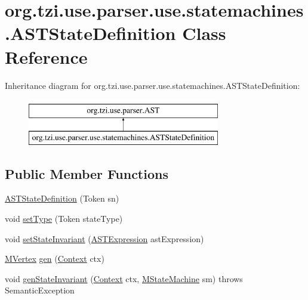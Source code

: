\hypertarget{classorg_1_1tzi_1_1use_1_1parser_1_1use_1_1statemachines_1_1_a_s_t_state_definition}{\section{org.\-tzi.\-use.\-parser.\-use.\-statemachines.\-A\-S\-T\-State\-Definition Class Reference}
\label{classorg_1_1tzi_1_1use_1_1parser_1_1use_1_1statemachines_1_1_a_s_t_state_definition}
}
Inheritance diagram for org.\-tzi.\-use.\-parser.\-use.\-statemachines.\-A\-S\-T\-State\-Definition\-:\begin{figure}[H]
\begin{center}
\leavevmode
\includegraphics[height=2.000000cm]{classorg_1_1tzi_1_1use_1_1parser_1_1use_1_1statemachines_1_1_a_s_t_state_definition}
\end{center}
\end{figure}
\subsection*{Public Member Functions}
\begin{DoxyCompactItemize}
\item 
\hyperlink{classorg_1_1tzi_1_1use_1_1parser_1_1use_1_1statemachines_1_1_a_s_t_state_definition_aaf8af62036dc111d9e37584ad4f00923}{A\-S\-T\-State\-Definition} (Token sn)
\item 
void \hyperlink{classorg_1_1tzi_1_1use_1_1parser_1_1use_1_1statemachines_1_1_a_s_t_state_definition_a6668c96d181fd1b3007ef8c8870eab76}{set\-Type} (Token state\-Type)
\item 
void \hyperlink{classorg_1_1tzi_1_1use_1_1parser_1_1use_1_1statemachines_1_1_a_s_t_state_definition_a8b31df8216863a40940c2300aacdbf2a}{set\-State\-Invariant} (\hyperlink{classorg_1_1tzi_1_1use_1_1parser_1_1ocl_1_1_a_s_t_expression}{A\-S\-T\-Expression} ast\-Expression)
\item 
\hyperlink{classorg_1_1tzi_1_1use_1_1uml_1_1mm_1_1statemachines_1_1_m_vertex}{M\-Vertex} \hyperlink{classorg_1_1tzi_1_1use_1_1parser_1_1use_1_1statemachines_1_1_a_s_t_state_definition_a0cacc1e50ad998fb326ecfa7a3254609}{gen} (\hyperlink{classorg_1_1tzi_1_1use_1_1parser_1_1_context}{Context} ctx)
\item 
void \hyperlink{classorg_1_1tzi_1_1use_1_1parser_1_1use_1_1statemachines_1_1_a_s_t_state_definition_a9bdd6251a56b4cfcc1316df6348d1b76}{gen\-State\-Invariant} (\hyperlink{classorg_1_1tzi_1_1use_1_1parser_1_1_context}{Context} ctx, \hyperlink{classorg_1_1tzi_1_1use_1_1uml_1_1mm_1_1statemachines_1_1_m_state_machine}{M\-State\-Machine} sm)  throws Semantic\-Exception 
\end{DoxyCompactItemize}
